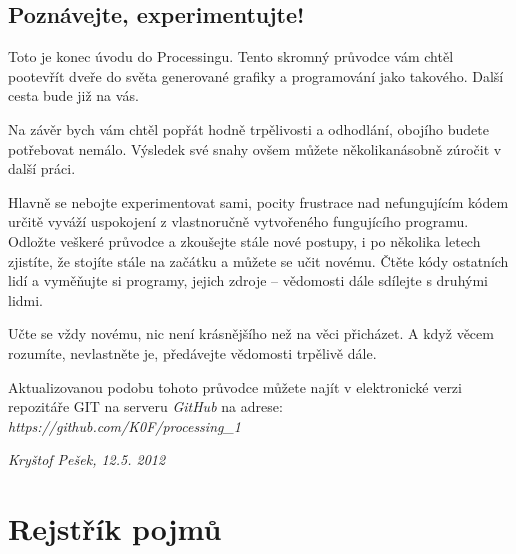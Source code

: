 \documentclass[10pt]{book}
\begin{document}
\section{Poznávejte, experimentujte!}

Toto je konec úvodu do Processingu. Tento skromný průvodce vám chtěl pootevřít dveře do světa generované grafiky a programování jako takového. Další cesta bude již na vás.

Na závěr bych vám chtěl popřát hodně trpělivosti a odhodlání, obojího budete potřebovat nemálo. Výsledek své snahy ovšem můžete několikanásobně zúročit v další práci.

Hlavně se nebojte experimentovat sami, pocity frustrace nad nefungujícím kódem určitě vyváží uspokojení z vlastnoručně vytvořeného fungujícího programu. Odložte veškeré průvodce a zkoušejte stále nové postupy, i po několika letech zjistíte, že stojíte stále na začátku a můžete se učit novému. Čtěte kódy ostatních lidí a vyměňujte si programy, jejich zdroje -- vědomosti dále sdílejte s druhými lidmi.

Učte se vždy novému, nic není krásnějšího než na věci přicházet. A když věcem rozumíte, nevlastněte je, předávejte vědomosti trpělivě dále.

\vfill

Aktualizovanou podobu tohoto průvodce můžete najít v elektronické verzi repozitáře GIT na serveru {\em GitHub} na adrese:\\
{\em https://github.com/K0F/processing\_1}

\begin{flushright}
{\em Kryštof Pešek, 12.5. 2012}
\end{flushright}

\chapter{Rejstřík pojmů}
\printglossaries
\printindex


\end{document}

